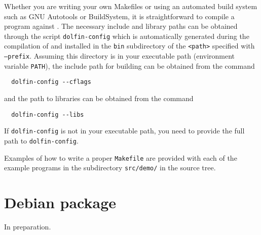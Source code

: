 Whether you are writing your own Makefiles or using an automated build
system such as GNU Autotools or BuildSystem, it is straightforward to
compile a program against \dolfin{}. The necessary include and library
paths can be obtained through the script \texttt{dolfin-config} which
is automatically generated during the compilation of \dolfin{} and
installed in the \texttt{bin} subdirectory of the \texttt{<path>}
specified with \texttt{--prefix}. Assuming this directory is in your
executable path (environment variable \texttt{PATH}), the include
path for building \dolfin{} can be obtained from the command
\begin{verbatim}
  dolfin-config --cflags
\end{verbatim}
and the path to \dolfin{} libraries can be obtained from the command
\begin{verbatim}
  dolfin-config --libs
\end{verbatim}
If \texttt{dolfin-config} is not in your executable path, you need to
provide the full path to \texttt{dolfin-config}.

Examples of how to write a proper \texttt{Makefile} are provided with
each of the example programs in the subdirectory \texttt{src/demo/} in
the \dolfin{} source tree.

\section{Debian package}

In preparation.
